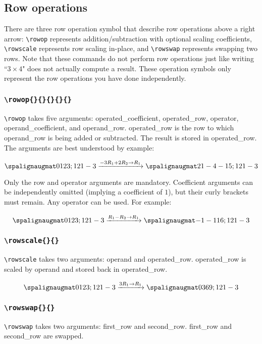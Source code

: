 \documentclass{article}
\begin{document}
\subsection{Row operations}
There are three row operation symbol that describe row operations above a right arrow: \verb=\rowop= represents addition/subtraction with optional scaling coefficients, \verb=\rowscale= represents row scaling in-place, and \verb=\rowswap= represents swapping two rows. Note that these commands do not perform row operations just like writing ``$3\times 4$" does not actually compute a result. These operation symbols only represent the row operations you have done independently.

\subsubsection{\texttt{\textbackslash rowop\{\}\{\}\{\}\{\}\{\}}}

\verb=\rowop= takes five arguments: operated\_coefficient, operated\_row, operator, operand\_coefficient, and operand\_row. operated\_row is the row to which operand\_row is being added or subtracted. The result is stored in operated\_row. The arguments are best understood by example:

\LTXexample[style=A]
\[\amat{0 1 2 3; 1 2 1 -3}
\rowop{-3}{1}{+}{2}{2}
\amat{2 1 -4 -15; 1 2 1 -3}\]
\endLTXexample

Only the row and operator arguments are mandatory. Coefficient arguments can be independently omitted (implying a coefficient of $1$), but their curly brackets must remain. Any operator can be used. For example:

\LTXexample[style=A]
\[\amat{0 1 2 3; 1 2 1 -3}
\rowop{}{1}{-}{}{2}
\amat{-1 -1 1 6; 1 2 1 -3}\]
\endLTXexample

\subsubsection{\texttt{\textbackslash rowscale\{\}\{\}}}
\verb=\rowscale= takes two arguments: operand and operated\_row. operated\_row is scaled by operand and stored back in operated\_row.

\LTXexample[style=A]
\[\amat{0 1 2 3; 1 2 1 -3}
\rowscale{3}{1}
\amat{0 3 6 9; 1 2 1 -3}\]
\endLTXexample

\subsubsection{\texttt{\textbackslash rowswap\{\}\{\}}}
\verb=\rowswap= takes two arguments: first\_row and second\_row. first\_row and second\_row are swapped.
\end{document}
